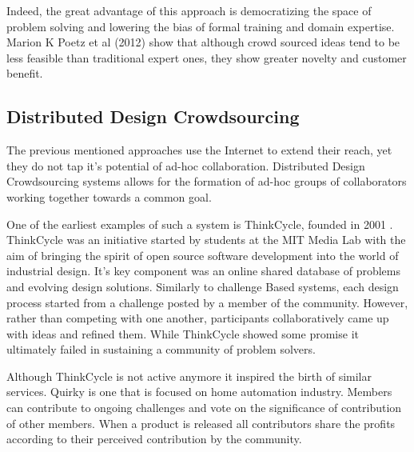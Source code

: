 Indeed, the great advantage of this approach is democratizing the space of problem solving and lowering the bias of formal training and domain expertise. Marion K Poetz et al (2012)\cite{poetz2012value} show that although crowd sourced ideas tend to be less feasible than traditional expert ones, they show greater novelty and customer benefit. 

\subsection{Distributed Design Crowdsourcing}

The previous mentioned approaches use the Internet to extend their reach, yet they do not tap it's potential of ad-hoc collaboration. Distributed Design Crowdsourcing systems allows for the formation of ad-hoc groups of collaborators working together towards a common goal.  

One of the earliest examples of such a system is ThinkCycle, founded in 2001 \cite{sawhney2002thinkcycle}. ThinkCycle was an initiative started by students at the MIT Media Lab with the aim of bringing the spirit of open source software development into the world of industrial design. It’s key component was an online shared database of problems and evolving design solutions. Similarly to challenge Based systems, each design process started from a challenge posted by a member of the community. However, rather than competing with one another, participants collaboratively came up with ideas and refined them. While ThinkCycle showed some promise it ultimately failed in sustaining a community of problem solvers.

Although ThinkCycle is not active anymore it inspired the birth of similar services. Quirky\cite{quirky} is one that is focused on home automation industry. Members can contribute to ongoing challenges and vote on the significance of contribution of other members. When a product is released all contributors share the profits according to their perceived contribution by the community. 

